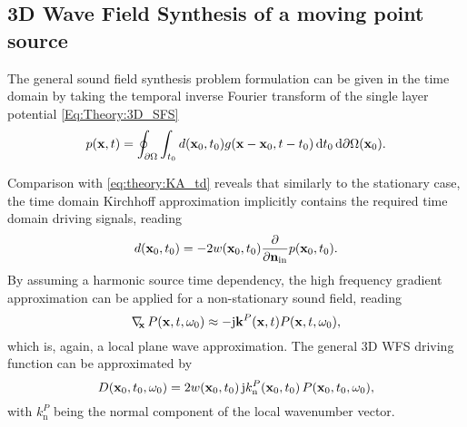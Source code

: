
\subsection{3D Wave Field Synthesis of a moving point source}

The general sound field synthesis problem formulation can be given in the time domain by taking the temporal inverse Fourier transform of the single layer potential \eqref{Eq:Theory:3D_SFS}
\begin{equation}
p(\mathbf{x},t) = \oint_{\partial \Omega} \int_{t_0} d(\mathbf{x}_0,t_0) g(\mathbf{x} - \mathbf{x}_0 , t-t_0 ) \, \mathrm{d} t_0 \, \mathrm{d} \partial \Omega ( \mathbf{x}_0 ).
\label{eq:moving_source:SFS_problem_td}
\end{equation}

Comparison with \eqref{eq:theory:KA_td} reveals that similarly to the stationary case, the time domain Kirchhoff approximation implicitly contains the required time domain driving signals, reading
\begin{equation}
\label{eq:moving_source:3D_wfs_driv_fun_td}
d(\mathbf{x}_0,t_0) =  -2 w(\mathbf{x}_0,t_0) \frac{\partial}{\partial \mathbf{n}_{\mathrm{in}}}  p(\mathbf{x}_0,t_0).
\end{equation}
By assuming a harmonic source time dependency, the high frequency gradient approximation can be applied for a non-stationary sound field, reading
\begin{equation}
\nabla_{\!\!\mathbf{x}}\, P(\mathbf{x},t,\omega_0) \approx - \mathrm{j} \mathbf{k}^P(\mathbf{x},t) P(\mathbf{x},t,\omega_0),
\label{eq:moving_source:gradient_appr_nonstat}
\end{equation}
which is, again, a local plane wave approximation.
The general 3D WFS driving function can be approximated by
\begin{equation}
\label{eq:moving_source:3D_wfs_driv_fun}
D(\mathbf{x}_0,t_0,\omega_0) =  2 w(\mathbf{x}_0,t_0) \, \mathrm{j} k_{\mathrm{n}}^P(\mathbf{x}_0,t_0) \, P(\mathbf{x}_0,t_0,\omega_0),
\end{equation}
with $k_{\mathrm{n}}^P$ being the normal component of the local wavenumber vector.
	
